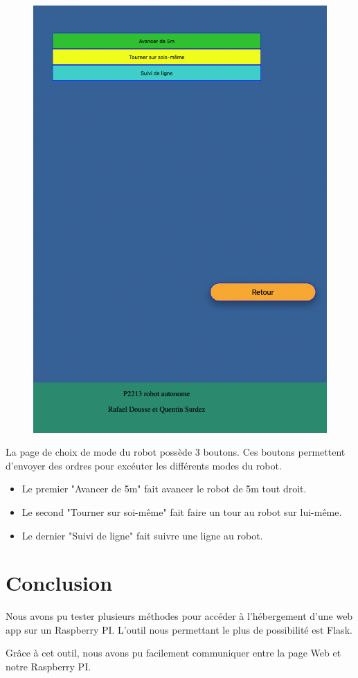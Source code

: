 \documentclass[
	a4paper,									%
	11pt,										%
	twoside,									%
	openright,									%
	notitlepage,									%
	parskip=half,								%
]{scrreprt}										%
\begin{document}
\newpage

\begin{figure}[!ht]
	\centering
	\includegraphics[scale=.4]{img/Choix_Mode_mini.png}
	\vspace{.5cm}
	\label{Choix}
\end{figure}

La page de choix de mode du robot possède 3 boutons. Ces boutons permettent d'envoyer des ordres pour excéuter les différents modes du robot.

\begin{itemize}
	\item Le premier "Avancer de 5m" fait avancer le robot de 5m tout droit. 
	\item Le second "Tourner sur soi-même" fait faire un tour au robot sur lui-même.
	\item Le dernier "Suivi de ligne" fait suivre une ligne au robot. 
\end{itemize}

\chapter{Conclusion}

Nous avons pu tester plusieurs méthodes pour accéder à l'hébergement d'une web app sur un Raspberry PI. 
L'outil nous permettant le plus de possibilité est Flask. \par
Grâce à cet outil, nous avons pu facilement communiquer entre la page Web et notre Raspberry PI. 
\end{document}
